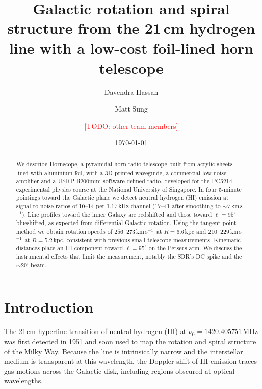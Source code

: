 \documentclass[aip,apl,reprint,amsmath,amssymb]{revtex4-2}
\newcommand{\todo}[1]{\textcolor{red}{[TODO: #1]}}
\newcommand{\kms}{km\,s$^{-1}$}
\begin{document}
\title{Galactic rotation and spiral structure from the 21\,cm hydrogen line with a low-cost foil-lined horn telescope}

\author{Davendra Hassan}
\author{Matt Sung}
\author{\todo{other team members}}

\date{\today}

\begin{abstract}
We describe Hornscope, a pyramidal horn radio telescope built from acrylic sheets lined with aluminium foil, with a 3D-printed waveguide, a commercial low-noise amplifier and a USRP B200mini software-defined radio, developed for the PC5214 experimental physics course at the National University of Singapore. In four 5-minute pointings toward the Galactic plane we detect neutral hydrogen (HI) emission at signal-to-noise ratios of 10--14 per 1.17\,kHz channel (17--41 after smoothing to $\sim$7\,\kms). Line profiles toward the inner Galaxy are redshifted and those toward $\ell = 95^\circ$ blueshifted, as expected from differential Galactic rotation. Using the tangent-point method we obtain rotation speeds of $256$--$273$\,\kms\ at $R = 6.6$\,kpc and $210$--$229$\,\kms\ at $R = 5.2$\,kpc, consistent with previous small-telescope measurements. Kinematic distances place an HI component toward $\ell = 95^\circ$ on the Perseus arm. We discuss the instrumental effects that limit the measurement, notably the SDR's DC spike and the $\sim$20$^\circ$ beam.
\end{abstract}

\maketitle

\section{Introduction}

The 21\,cm hyperfine transition of neutral hydrogen (HI) at $\nu_0 = 1420.405751$\,MHz was first detected in 1951\cite{EwenPurcell1951} and soon used to map the rotation and spiral structure of the Milky Way.\cite{vandeHulst1954,Oort1958} Because the line is intrinsically narrow and the interstellar medium is transparent at this wavelength, the Doppler shift of HI emission traces gas motions across the Galactic disk, including regions obscured at optical wavelengths.
\end{document}
